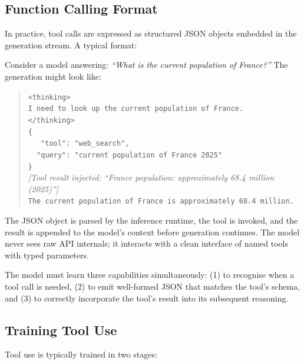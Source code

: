 \subsection{Function Calling Format}
\label{subsec:function-calling-format}

In practice, tool calls are expressed as structured JSON objects
embedded in the generation stream. A typical format:

\begin{example}
\label{ex:tool-call-json}
Consider a model answering: \emph{``What is the current population
of France?''} The generation might look like:

\begin{quote}
\small
\texttt{<thinking>}\\
\texttt{I need to look up the current population of France.}\\
\texttt{</thinking>}\\[0.3em]
\texttt{\{}\\\
\texttt{\ \ "tool": "web\_search",}\\
\texttt{\ \ "query": "current population of France 2025"}\\
\texttt{\}}\\[0.3em]
\textit{[Tool result injected: ``France population: approximately 68.4 million (2025)'']}\\[0.3em]
\texttt{The current population of France is approximately 68.4 million.}
\end{quote}

The JSON object is parsed by the inference runtime, the tool is
invoked, and the result is appended to the model's context before
generation continues. The model never sees raw API internals; it
interacts with a clean interface of named tools with typed parameters.
\end{example}

The model must learn three capabilities simultaneously: (1) to
recognise when a tool call is needed, (2) to emit well-formed JSON
that matches the tool's schema, and (3) to correctly incorporate the
tool's result into its subsequent reasoning.

\subsection{Training Tool Use}
\label{subsec:training-tool-use}

Tool use is typically trained in two stages:

